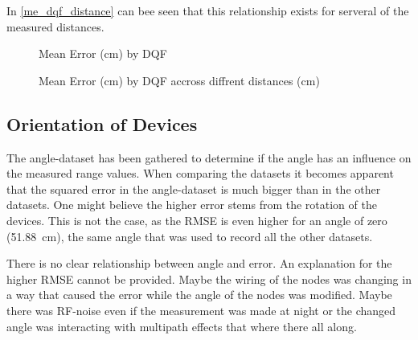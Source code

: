 In \autoref{me_dqf_distance} can bee seen that this relationship exists for serveral of the measured distances.

%	
%
%	
\begin{figure}[h]
	\centering
	
	\caption[Mean Error by DQF]{Mean Error (cm) by DQF}
	\label{me_dqf}
\end{figure}

\begin{figure}[h]
	\centering
	
	\caption{Mean Error (cm) by DQF accross diffrent distances (cm)}
	\label{me_dqf_distance}
\end{figure}

\subsection{Orientation of Devices}

The angle-dataset has been gathered to determine if the angle has an influence on the measured range values.
When comparing the datasets it becomes apparent that the squared error in the angle-dataset is much bigger than in the other datasets.
One might believe the higher error stems from the rotation of the devices.
This is not the case, as the RMSE is even higher for an angle of zero (\SI{51.88}{cm}), the same angle that was used to record all the other datasets.

There is no clear relationship between angle and error.
An explanation for the higher RMSE cannot be provided.
Maybe the wiring of the nodes was changing in a way that caused the error while the angle of the nodes was modified.
Maybe there was RF-noise even if the measurement was made at night or the changed angle was interacting with multipath effects that where there all along.
%	

